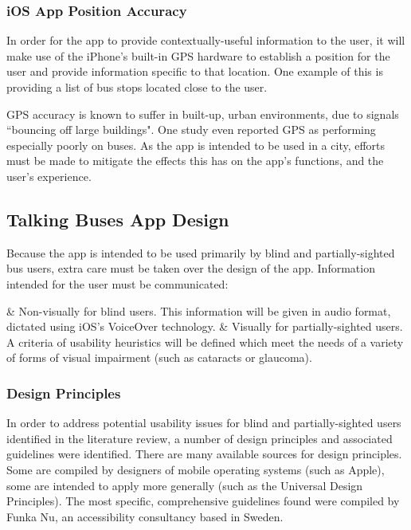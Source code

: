 \documentclass[10pt,twocolumn]{article}
\newcommand{\citep}[1]{}
\begin{document}
\subsubsection{iOS App Position Accuracy}
In order for the app to provide contextually-useful information to the user, it will make use of the iPhone's built-in GPS hardware to establish a position for the user and provide information specific to that location. One example of this is providing a list of bus stops located close to the user.

GPS accuracy is known to suffer in built-up, urban environments\citep{gpsAccuracy}, due to signals ``bouncing off large buildings"\citep{gpsCity}. One study even reported GPS as performing especially poorly on buses\citep{gpsFeasibility}. As the app is intended to be used in a city, efforts must be made to mitigate the effects this has on the app's functions, and the user's experience.

\subsection{Talking Buses App Design}
\label{sec:appDesign}
Because the app is intended to be used primarily by blind and partially-sighted bus users, extra care must be taken over the design of the app. Information intended for the user must be communicated:
\begin{easylist}[itemize]
& Non-visually for blind users. This information will be given in audio format, dictated using iOS's VoiceOver technology.
& Visually for partially-sighted users. A criteria of usability heuristics will be defined which meet the needs of a variety of forms of visual impairment (such as cataracts or glaucoma).
\end{easylist}

\subsubsection{Design Principles}
\label{principles}
In order to address potential usability issues for blind and partially-sighted users identified in the literature review, a number of design principles and associated guidelines were identified.  There are many available sources for design principles. Some are compiled by designers of mobile operating systems (such as Apple), some are intended to apply more generally (such as the Universal Design Principles). The most specific, comprehensive guidelines found were compiled by Funka Nu, an accessibility consultancy based in Sweden\citep{funkaNu}.
\end{document}
